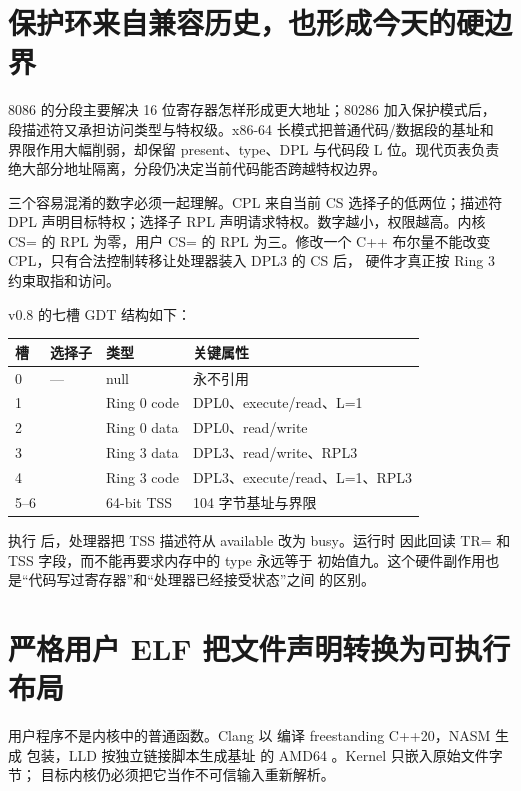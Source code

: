 \section{保护环来自兼容历史，也形成今天的硬边界}

8086 的分段主要解决 16 位寄存器怎样形成更大地址；80286 加入保护模式后，
段描述符又承担访问类型与特权级。x86-64 长模式把普通代码/数据段的基址和
界限作用大幅削弱，却保留 present、type、DPL 与代码段 L 位。现代页表负责
绝大部分地址隔离，分段仍决定当前代码能否跨越特权边界。

三个容易混淆的数字必须一起理解。CPL 来自当前 CS 选择子的低两位；描述符
DPL 声明目标特权；选择子 RPL 声明请求特权。数字越小，权限越高。内核
CS= 的 RPL 为零，用户 CS= 的 RPL 为三。修改一个
C++ 布尔量不能改变 CPL，只有合法控制转移让处理器装入 DPL3 的 CS 后，
硬件才真正按 Ring 3 约束取指和访问。

v0.8 的七槽 GDT 结构如下：

\begin{longtable}{L{0.10\textwidth}L{0.15\textwidth}L{0.28\textwidth}L{0.33\textwidth}}
\toprule
槽 & 选择子 & 类型 & 关键属性\\
 & --- & null & 永不引用\\
1 &  & Ring 0 code & DPL0、execute/read、L=1\\
2 &  & Ring 0 data & DPL0、read/write\\
3 &  & Ring 3 data & DPL3、read/write、RPL3\\
4 &  & Ring 3 code & DPL3、execute/read、L=1、RPL3\\
5--6 &  & 64-bit TSS & 104 字节基址与界限\\
\bottomrule
\end{longtable}

执行  后，处理器把 TSS 描述符从 available 改为 busy。运行时
因此回读 TR= 和 TSS 字段，而不能再要求内存中的 type 永远等于
初始值九。这个硬件副作用也是“代码写过寄存器”和“处理器已经接受状态”之间
的区别。

\section{严格用户 ELF 把文件声明转换为可执行布局}

用户程序不是内核中的普通函数。Clang 以
 编译 freestanding C++20，NASM 生成
 包装，LLD 按独立链接脚本生成基址
 的 AMD64 。Kernel 只嵌入原始文件字节；
目标内核仍必须把它当作不可信输入重新解析。

